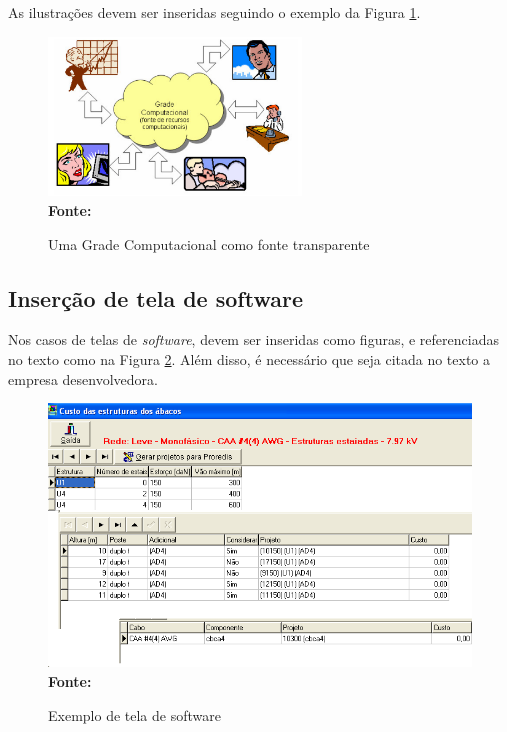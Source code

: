 As ilustrações devem ser inseridas seguindo o exemplo da Figura \ref{fig:figura1}. 
\begin{figure}[ht]
	\centering	
	\caption[\hspace{0.1cm}Grade Computacional.]{Uma Grade Computacional como fonte transparente}
	\vspace{-0.4cm}
	\includegraphics[width=0.6\textwidth]{figuras/grade-comp.png}
	 \vspace{-0.2cm}
	\\\textbf{\footnotesize Fonte: \cite{cap-livro} }
	\label{fig:figura1}
\end{figure}
\vspace{-0.5cm}

\subsection{\esp Inserção de tela de software}

Nos casos de telas de \textit{software}, devem ser inseridas como figuras, e referenciadas no texto
como na Figura \ref{fig:tela1}. Além disso, é necessário que seja citada no texto a empresa desenvolvedora.

\begin{figure}[!ht]
	\centering	
	\caption[\hspace{0.1cm}Exemplo de tela de software.]{Exemplo de tela de software}
	  \vspace{-0.4cm}
	\includegraphics[width=.8\textwidth]{figuras/tela1.png}
	 \vspace{-0.3cm}
	\\\textbf{\footnotesize Fonte: \cite{tela1}}
	\label{fig:tela1}
\end{figure}

